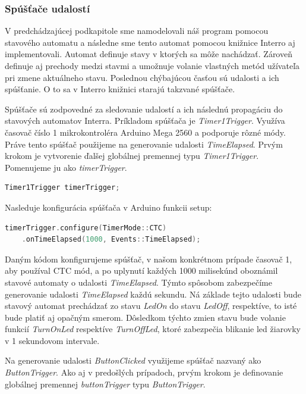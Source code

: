 \subsubsection{Spúšťače udalostí}
V predchádzajúcej podkapitole sme namodelovali náš program pomocou stavového automatu a následne sme tento automat pomocou knižnice Interro aj implementovali.
Automat definuje stavy v ktorých sa môže nachádzať. Zároveň definuje aj prechody medzi stavmi a umožnuje volanie vlastných metód užívateľa pri zmene aktuálneho stavu.
Poslednou chýbajúcou časťou sú udalosti a ich spúšťanie. O to sa v Interro knižnici starajú takzvané spúšťače. \par
Spúšťače sú zodpovedné za sledovanie udalostí a ich následnú propagáciu do stavových automatov Interra.
Príkladom spúšťača je \textit{Timer1Trigger}. Využíva časovač číslo 1 mikrokontroléra Arduino Mega 2560 a podporuje rôzné módy.
Práve tento spúšťač použijeme na generovanie udalosti \textit{TimeElapsed}. Prvým krokom je vytvorenie ďalšej globálnej premennej typu \textit{Timer1Trigger}.
Pomenujeme ju ako \textit{timerTrigger}.
\begin{lstlisting}[language=c++]  
Timer1Trigger timerTrigger;            
\end{lstlisting}

Nasleduje konfigurácia spúšťača v Arduino funkcii setup:
\begin{lstlisting}[language=c++]  
timerTrigger.configure(TimerMode::CTC)
    .onTimeElapsed(1000, Events::TimeElapsed); 
\end{lstlisting}

Daným kódom konfigurujeme spúšťač, v našom konkrétnom prípade časovač 1, aby používal CTC mód, a po uplynutí každých 1000 milisekúnd oboznámil stavové automaty
o udalosti \textit{TimeElapsed}. Týmto spôsobom zabezpečíme generovanie udalosti \textit{TimeElapsed} každú sekundu. Ná základe tejto udalosti bude stavový automat
prechádzať zo stavu \textit{LedOn} do stavu \textit{LedOff}, respektíve, to isté bude platiť aj opačným smerom. Dôsledkom týchto zmien stavu bude volanie funkcií
\textit{TurnOnLed} respektíve \textit{TurnOffLed}, ktoré zabezpečia blikanie led žiarovky v 1 sekundovom intervale.  \par

Na generovanie udalosti \textit{ButtonClicked} využijeme spúšťač nazvaný ako \textit{ButtonTrigger}. Ako aj v predošlých prípadoch, prvým krokom je definovanie globálnej premennej
\textit{buttonTrigger} typu \textit{ButtonTrigger}.

